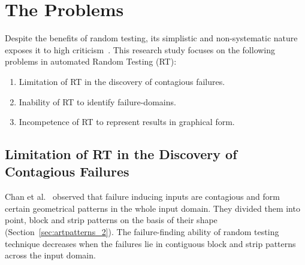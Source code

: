 \section{The Problems}
Despite the benefits of random testing, its simplistic and non-systematic nature exposes it to high criticism~\cite{myers2011art, white1987software}. This research study focuses on the following problems in automated Random Testing (RT):


\begin{enumerate}
\item Limitation of RT in the discovery of contagious failures.
\item Inability of RT to identify failure-domains.
\item Incompetence of RT to represent results in graphical form. 
\end{enumerate}

\subsection{Limitation of RT in the Discovery of Contagious Failures}
Chan et al.~\cite{chan1996proportional} observed that failure inducing inputs are contagious and form certain geometrical patterns in the whole input domain. They divided them into point, block and strip patterns on the basis of their shape (Section~\ref{sec:artpatterns_2}). %
The failure-finding ability of random testing technique decreases when the failures lie in contiguous block and strip patterns across the input domain.

